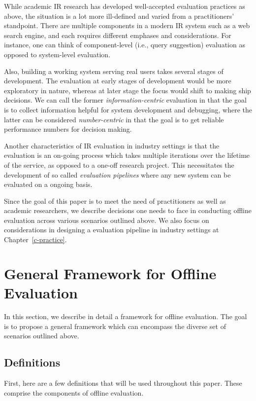 While academic IR research has developed well-accepted evaluation practices as above, the situation is a lot more ill-defined and varied from a practitioners' standpoint. There are multiple components in a modern IR system such as a web search engine, and each requires different emphases and considerations. For instance, one can think of component-level (i.e., query suggestion) evaluation as opposed to system-level evaluation. 

Also, building a working system serving real users takes several stages of development. The evaluation at early stages of development would be more exploratory in nature, whereas at later stage the focus would shift to making ship decisions. We can call the former \textit{information-centric} evaluation in that the goal is to collect information helpful for system development and debugging, where the latter can be considered \textit{number-centric} in that the goal is to get reliable performance numbers for decision making.

Another characteristics of IR evaluation in industry settings is that the evaluation is an on-going process which takes multiple iterations over the lifetime of the service, as opposed to a one-off research project. This necessitates the development of so called \textit{evaluation pipelines} where any new system can be evaluated on a ongoing basis.

Since the goal of this paper is to meet the need of practitioners as well as academic researchers, we describe decisions one needs to face in conducting offline evaluation across various scenarios outlined above. We also focus on considerations in designing a evaluation pipeline in industry settings at Chapter~\ref{c-practice}.

\section{General Framework for Offline Evaluation}

In this section, we describe in detail a framework for offline evaluation. The goal is to propose a general framework which can encompass the diverse set of scenarios outlined above. 

\subsection{Definitions}

First, here are a few definitions that will be used throughout this paper. These comprise the components of offline evaluation.

